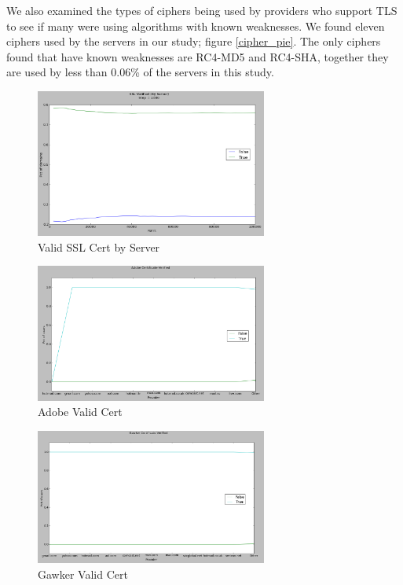 We also examined the types of ciphers being used by providers who support TLS to 
see if many were using algorithms with known weaknesses. We found eleven ciphers 
used by the servers in our study; figure \ref{cipher_pie}. The only ciphers found that 
have known weaknesses are RC4-MD5 and RC4-SHA, together they are used by less 
than 0.06\% of the servers in this study.

\begin{figure}
    \includegraphics[width=3.0in]{images/server_verified.png}
    \caption{Valid SSL Cert by Server}
    \label{server_verified}
\end{figure}

\begin{figure}
    \includegraphics[width=3.0in]{images/adobe_verified.png}
    \caption{Adobe Valid Cert}
    \label{adobe_verified}
\end{figure}

\begin{figure}
    \includegraphics[width=3.0in]{images/gawker_verified.png}
    \caption{Gawker Valid Cert}
    \label{gawker_verified}
\end{figure}

